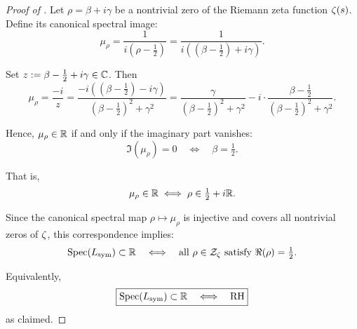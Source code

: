 \begin{proof}[Proof of ]
Let \( \rho = \beta + i\gamma \) be a nontrivial zero of the Riemann zeta function \( \zeta(s) \). Define its canonical spectral image:
\[
\mu_\rho = \frac{1}{i(\rho - \tfrac{1}{2})} = \frac{1}{i((\beta - \tfrac{1}{2}) + i\gamma)}.
\]

Set \( z := \beta - \tfrac{1}{2} + i\gamma \in \mathbb{C} \). Then
\[
\mu_\rho = \frac{-i}{z} = \frac{-i((\beta - \tfrac{1}{2}) - i\gamma)}{(\beta - \tfrac{1}{2})^2 + \gamma^2}
= \frac{\gamma}{(\beta - \tfrac{1}{2})^2 + \gamma^2}
- i \cdot \frac{\beta - \tfrac{1}{2}}{(\beta - \tfrac{1}{2})^2 + \gamma^2}.
\]

Hence, \( \mu_\rho \in \mathbb{R} \) if and only if the imaginary part vanishes:
\[
\Im(\mu_\rho) = 0 \quad \Longleftrightarrow \quad \beta = \tfrac{1}{2}.
\]

That is,
\[
\mu_\rho \in \mathbb{R} \iff \rho \in \tfrac{1}{2} + i\mathbb{R}.
\]

Since the canonical spectral map \( \rho \mapsto \mu_\rho \) is injective and covers all nontrivial zeros of \( \zeta \), this correspondence implies:
\[
\operatorname{Spec}(L_{\mathrm{sym}}) \subset \mathbb{R} \quad \Longleftrightarrow \quad \text{all } \rho \in \mathcal{Z}_\zeta \text{ satisfy } \Re(\rho) = \tfrac{1}{2}.
\]

\medskip

\noindent
Equivalently,
\[
\boxed{
\operatorname{Spec}(L_{\mathrm{sym}}) \subset \mathbb{R} \quad \Longleftrightarrow \quad \mathrm{RH}
}
\]
as claimed.
\end{proof}
